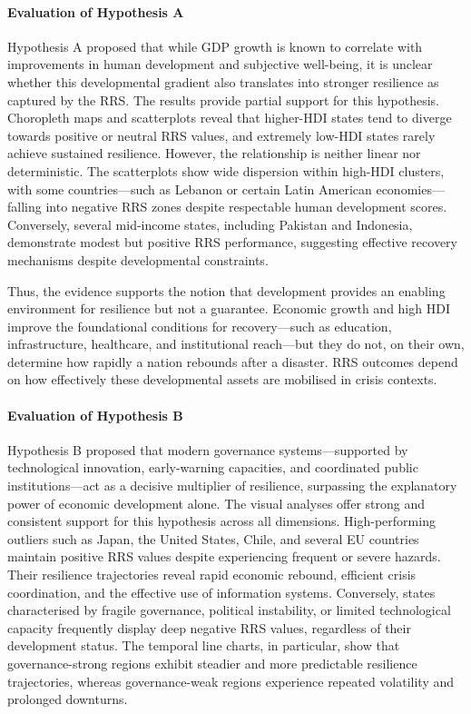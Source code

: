 \documentclass[conference]{IEEEtran}
\begin{document}
\paragraph{Evaluation of Hypothesis A}
Hypothesis A proposed that while GDP growth is known to correlate with improvements in human development and subjective well-being, it is unclear whether this developmental gradient also translates into stronger resilience as captured by the RRS. The results provide partial support for this hypothesis. Choropleth maps and scatterplots reveal that higher-HDI states tend to diverge towards positive or neutral RRS values, and extremely low-HDI states rarely achieve sustained resilience. However, the relationship is neither linear nor deterministic. The scatterplots show wide dispersion within high-HDI clusters, with some countries—such as Lebanon or certain Latin American economies—falling into negative RRS zones despite respectable human development scores. Conversely, several mid-income states, including Pakistan and Indonesia, demonstrate modest but positive RRS performance, suggesting effective recovery mechanisms despite developmental constraints.

Thus, the evidence supports the notion that development provides an enabling environment for resilience but not a guarantee. Economic growth and high HDI improve the foundational conditions for recovery—such as education, infrastructure, healthcare, and institutional reach—but they do not, on their own, determine how rapidly a nation rebounds after a disaster. RRS outcomes depend on how effectively these developmental assets are mobilised in crisis contexts.

\paragraph{Evaluation of Hypothesis B}
Hypothesis B proposed that modern governance systems—supported by technological innovation, early-warning capacities, and coordinated public institutions—act as a decisive multiplier of resilience, surpassing the explanatory power of economic development alone. The visual analyses offer strong and consistent support for this hypothesis across all dimensions. High-performing outliers such as Japan, the United States, Chile, and several EU countries maintain positive RRS values despite experiencing frequent or severe hazards. Their resilience trajectories reveal rapid economic rebound, efficient crisis coordination, and the effective use of information systems. Conversely, states characterised by fragile governance, political instability, or limited technological capacity frequently display deep negative RRS values, regardless of their development status. The temporal line charts, in particular, show that governance-strong regions exhibit steadier and more predictable resilience trajectories, whereas governance-weak regions experience repeated volatility and prolonged downturns.
\end{document}
